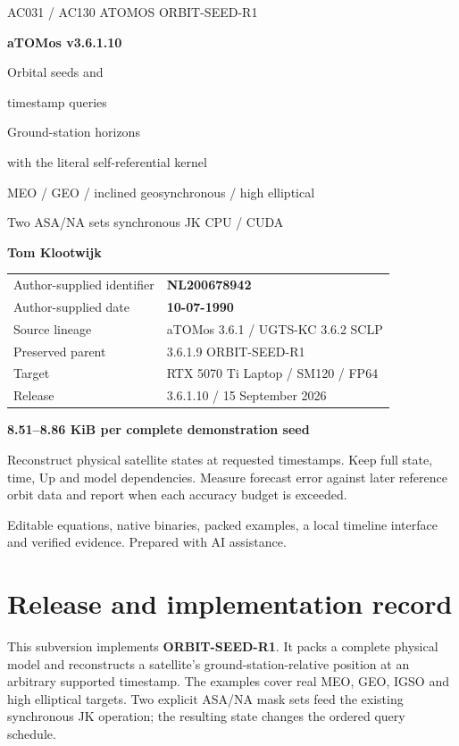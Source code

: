 \documentclass[11pt,a4paper]{article}
\begin{document}
\begin{titlepage}\thispagestyle{empty}
{\sffamily\color{accent}\large AC031 / AC130 ATOMOS \hfill ORBIT-SEED-R1}\par
\vspace{18mm}
{\sffamily\bfseries\fontsize{47}{55}\selectfont\color{ink}aTOMos v3.6.1.10}\par
\vspace{10mm}
{\sffamily\fontsize{28}{34}\selectfont Orbital seeds and\par timestamp queries}\par
\vspace{7mm}
{\sffamily\fontsize{21}{27}\selectfont\color{gold}Ground-station horizons\par with the literal self-referential kernel}\par
\vspace{12mm}
{\large MEO / GEO / inclined geosynchronous / high elliptical\par
Two ASA/NA sets \;\textperiodcentered\; synchronous JK \;\textperiodcentered\; CPU / CUDA}\par
\vspace{16mm}
{\sffamily\bfseries\Large Tom Klootwijk}\par
\begin{tabular}{@{}ll@{}}
Author-supplied identifier & \textbf{NL200678942}\\
Author-supplied date & \textbf{10-07-1990}\\
Source lineage & aTOMos 3.6.1 / UGTS-KC 3.6.2 SCLP\\
Preserved parent & 3.6.1.9 ORBIT-SEED-R1\\
Target & RTX 5070 Ti Laptop / SM120 / FP64\\
Release & 3.6.1.10 / 15 September 2026\\
\end{tabular}
\vfill
\begin{panel}
\textbf{8.51--8.86 KiB per complete demonstration seed}\par
Reconstruct physical satellite states at requested timestamps. Keep full state,
time, Up and model dependencies. Measure forecast error against later reference
orbit data and report when each accuracy budget is exceeded.
\end{panel}
{\small\color{muted}Editable equations, native binaries, packed examples, a local
timeline interface and verified evidence. Prepared with AI assistance.}
\end{titlepage}
\setcounter{page}{2}
\section*{Release and implementation record}
This subversion implements \textbf{ORBIT-SEED-R1}. It packs a complete physical
model and reconstructs a satellite's ground-station-relative position at an
arbitrary supported timestamp. The examples cover real MEO, GEO, IGSO and high
elliptical targets. Two explicit ASA/NA mask sets feed the existing synchronous
JK operation; the resulting state changes the ordered query schedule.
\end{document}
